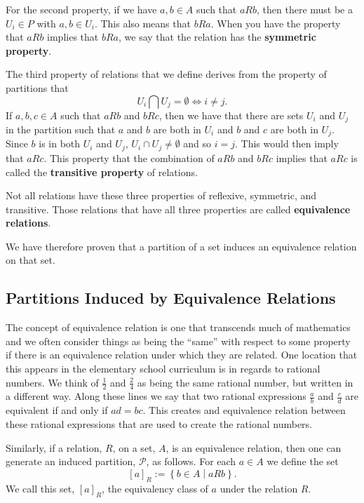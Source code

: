 \documentclass[
]{book}
\theoremstyle{definition}
\theoremstyle{definition}
\theoremstyle{definition}
\theoremstyle{remark}
\begin{document}
For the second property, if we have \(a,b\in A\) such that \(aRb\), then there must be a \(U_i\in P\) with \(a,b\in U_i\). This also means that \(bRa\). When you have the property that \(aRb\) implies that \(bRa\), we say that the relation has the \textbf{symmetric property}.

The third property of relations that we define derives from the property of partitions that
\[U_i \bigcap U_j = \emptyset \Leftrightarrow i\neq j.\] If \(a,b,c\in A\) such that \(aRb\) and \(bRc\), then we have that there are sets \(U_i\) and \(U_j\) in the partition such that \(a\) and \(b\) are both in \(U_i\) and \(b\) and \(c\) are both in \(U_j\). Since \(b\) is in both \(U_i\) and \(U_j\), \(U_i \cap U_j \neq \emptyset\) and so \(i=j\). This would then imply that \(aRc\). This property that the combination of \(aRb\) and \(bRc\) implies that \(aRc\) is called the \textbf{transitive property} of relations.

Not all relations have these three properties of reflexive, symmetric, and transitive. Those relations that have all three properties are called \textbf{equivalence relations}.

We have therefore proven that a partition of a set induces an equivalence relation on that set.

\hypertarget{partitions-induced-by-equivalence-relations}{%
\subsection{Partitions Induced by Equivalence Relations}\label{partitions-induced-by-equivalence-relations}}

The concept of equivalence relation is one that transcends much of mathematics and we often consider things as being the ``same'' with respect to some property if there is an equivalence relation under which they are related. One location that this appears in the elementary school curriculum is in regards to rational numbers. We think of \(\frac{1}{2}\) and \(\frac{2}{4}\) as being the same rational number, but written in a different way. Along these lines we say that two rational expressions \(\frac{a}{b}\) and \(\frac{c}{d}\) are equivalent if and only if \(ad=bc\). This creates and equivalence relation between these rational expressions that are used to create the rational numbers.

Similarly, if a relation, \(R\), on a set, \(A\), is an equivalence relation, then one can generate an induced partition, \(\mathcal{P}\), as follows. For each \(a\in A\) we define the set \[[a]_R := \left\{ b\in A \middle \vert aRb\right\}.\] We call this set, \([a]_R\), the equivalency class of \(a\) under the relation \(R\).
\end{document}
